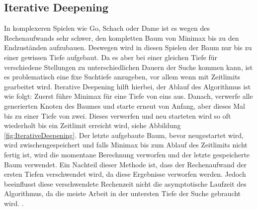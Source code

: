 \documentclass[12pt,a4paper,bibliography=totocnumbered,listof=totocnumbered]{article}
\begin{document}

\subsection{Iterative Deepening}
\label{chap:IterativeDeepening}
In komplexeren Spielen wie Go, Schach oder Dame ist es wegen des Rechenaufwands sehr schwer, den kompletten Baum von Minimax bis zu den
Endzuständen aufzubauen. Deswegen wird in diesen Spielen der Baum nur bis zu einer gewissen Tiefe aufgebaut. Da es aber bei einer gleichen
Tiefe für verschiedene Stellungen zu unterschiedlichen Dauern der Suche kommen kann, ist es problematisch eine fixe Suchtiefe anzugeben, 
vor allem wenn mit Zeitlimits gearbeitet wird. Iterative Deepening hilft hierbei, der Ablauf des Algorithmus ist wie folgt:
Zuerst führe Minimax für eine Tiefe von eins aus. Danach, verwerfe alle generierten Knoten des Baumes und starte erneut von Anfang, aber dieses
Mal bis zu einer Tiefe von zwei. Dieses verwerfen und neu starteten wird so oft wiederholt bis ein Zeitlimit erreicht wird, siehe Abbildung \ref{fig:IterativeDeepening}. 
Der letzte aufgebaute Baum, bevor neugestartet wird, wird zwischengespeichert und falls Minimax bis zum Ablauf des Zeitlimits nicht fertig ist,
wird die momentane Berechnung verworfen und der letzte gespeicherte Baum verwendet. Ein Nachteil dieser Methode ist, dass 
der Rechenaufwand der ersten Tiefen verschwendet wird, da diese Ergebnisse verworfen werden. Jedoch beeinflusst diese 
verschwendete Rechenzeit nicht die asymptotische Laufzeit des Algorithmus, da die meiste Arbeit in der untersten Tiefe der 
Suche gebraucht wird. \cite{IterativeDeepening}.
\end{document}
